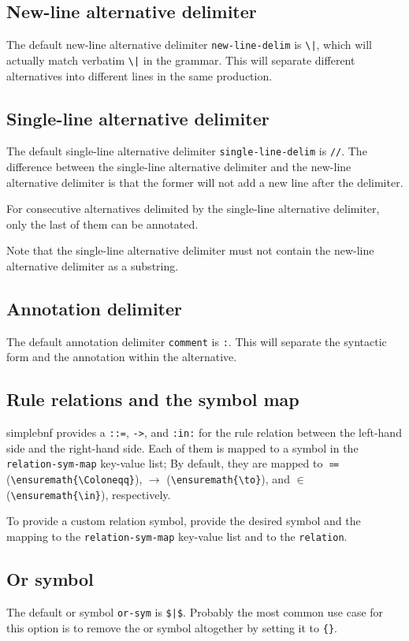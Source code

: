 \documentclass[11pt]{article}
\begin{document}
\subsection{New-line alternative delimiter}
The default new-line alternative delimiter \verb/new-line-delim/ is \verb/\|/, which will actually match verbatim \verb/\|/ in the grammar.
This will separate different alternatives into different lines in the same production.

\subsection{Single-line alternative delimiter}
The default single-line alternative delimiter \verb/single-line-delim/ is \verb|//|.
The difference between the single-line alternative delimiter and the new-line alternative delimiter is that the former will not add a new line after the delimiter.

For consecutive alternatives delimited by the single-line alternative delimiter, only the last of them can be annotated.

Note that the single-line alternative delimiter must not contain the new-line alternative delimiter as a substring.

\subsection{Annotation delimiter}
The default annotation delimiter \verb/comment/ is \verb/:/.
This will separate the syntactic form and the annotation within the alternative.

\subsection{Rule relations and the symbol map}
\textsf{simplebnf} provides a \verb/::=/, \verb/->/, and \verb/:in:/ for the rule relation between the left-hand side and the right-hand side.
Each of them is mapped to a symbol in the \verb/relation-sym-map/ key-value list; By default, they are mapped to $\Coloneqq$ (\verb/\ensuremath{\Coloneqq}/), $\to$ (\verb/\ensuremath{\to}/), and $\in$ (\verb/\ensuremath{\in}/), respectively.

To provide a custom relation symbol, provide the desired symbol and the mapping to the \verb/relation-sym-map/ key-value list and to the \verb/relation/.

\subsection{Or symbol}
The default or symbol \verb/or-sym/ is \verb/$|$/.
Probably the most common use case for this option is to remove the or symbol altogether by setting it to \verb/{}/.
\end{document}
